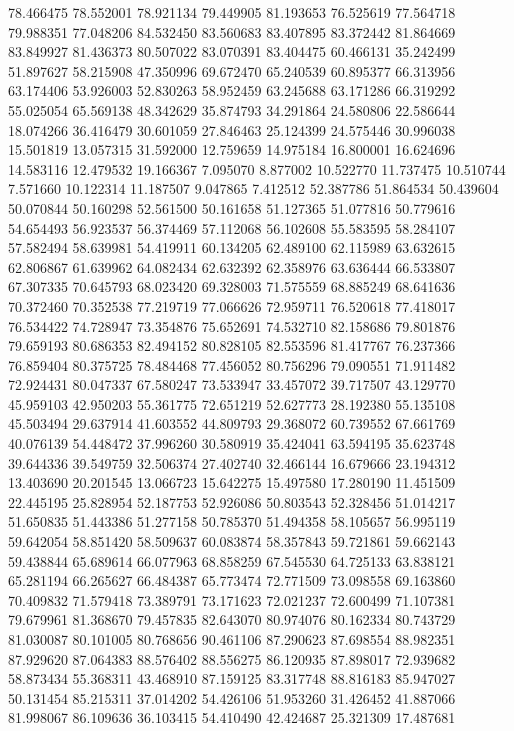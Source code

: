 78.466475
78.552001
78.921134
79.449905
81.193653
76.525619
77.564718
79.988351
77.048206
84.532450
83.560683
83.407895
83.372442
81.864669
83.849927
81.436373
80.507022
83.070391
83.404475
60.466131
35.242499
51.897627
58.215908
47.350996
69.672470
65.240539
60.895377
66.313956
63.174406
53.926003
52.830263
58.952459
63.245688
63.171286
66.319292
55.025054
65.569138
48.342629
35.874793
34.291864
24.580806
22.586644
18.074266
36.416479
30.601059
27.846463
25.124399
24.575446
30.996038
15.501819
13.057315
31.592000
12.759659
14.975184
16.800001
16.624696
14.583116
12.479532
19.166367
7.095070
8.877002
10.522770
11.737475
10.510744
7.571660
10.122314
11.187507
9.047865
7.412512
52.387786
51.864534
50.439604
50.070844
50.160298
52.561500
50.161658
51.127365
51.077816
50.779616
54.654493
56.923537
56.374469
57.112068
56.102608
55.583595
58.284107
57.582494
58.639981
54.419911
60.134205
62.489100
62.115989
63.632615
62.806867
61.639962
64.082434
62.632392
62.358976
63.636444
66.533807
67.307335
70.645793
68.023420
69.328003
71.575559
68.885249
68.641636
70.372460
70.352538
77.219719
77.066626
72.959711
76.520618
77.418017
76.534422
74.728947
73.354876
75.652691
74.532710
82.158686
79.801876
79.659193
80.686353
82.494152
80.828105
82.553596
81.417767
76.237366
76.859404
80.375725
78.484468
77.456052
80.756296
79.090551
71.911482
72.924431
80.047337
67.580247
73.533947
33.457072
39.717507
43.129770
45.959103
42.950203
55.361775
72.651219
52.627773
28.192380
55.135108
45.503494
29.637914
41.603552
44.809793
29.368072
60.739552
67.661769
40.076139
54.448472
37.996260
30.580919
35.424041
63.594195
35.623748
39.644336
39.549759
32.506374
27.402740
32.466144
16.679666
23.194312
13.403690
20.201545
13.066723
15.642275
15.497580
17.280190
11.451509
22.445195
25.828954
52.187753
52.926086
50.803543
52.328456
51.014217
51.650835
51.443386
51.277158
50.785370
51.494358
58.105657
56.995119
59.642054
58.851420
58.509637
60.083874
58.357843
59.721861
59.662143
59.438844
65.689614
66.077963
68.858259
67.545530
64.725133
63.838121
65.281194
66.265627
66.484387
65.773474
72.771509
73.098558
69.163860
70.409832
71.579418
73.389791
73.171623
72.021237
72.600499
71.107381
79.679961
81.368670
79.457835
82.643070
80.974076
80.162334
80.743729
81.030087
80.101005
80.768656
90.461106
87.290623
87.698554
88.982351
87.929620
87.064383
88.576402
88.556275
86.120935
87.898017
72.939682
58.873434
55.368311
43.468910
87.159125
83.317748
88.816183
85.947027
50.131454
85.215311
37.014202
54.426106
51.953260
31.426452
41.887066
81.998067
86.109636
36.103415
54.410490
42.424687
25.321309
17.487681
